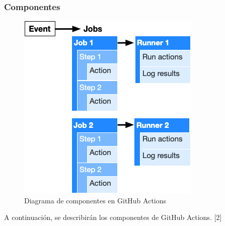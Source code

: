 \documentclass[twoside,twocolumn]{article}
\begin{document}
\subsubsection{Componentes}

\begin{figure}[h]
    \includegraphics[width = \columnwidth]{./Imagenes/overview-actions-design.png}
    \caption{Diagrama de componentes en GitHub Actions}
\end{figure}

A continuación, se describirán los componentes de GitHub Actions. [2]
\end{document}
